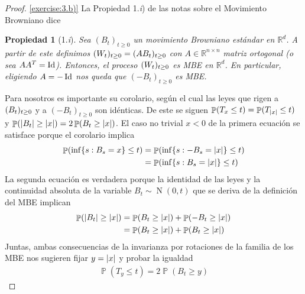 \documentclass{article}
\DeclareMathOperator{\prob}{\mathbb{P}}
\DeclareMathOperator{\normal}{N}
\DeclareMathOperator{\identity}{\textnormal{Id}}
\newcommand{\realnum}{\mathbb{R}}
\newcommand{\transpose}[1]{#1^T}
\newcommand{\brownian}{B}
\newtheorem{property}{Propiedad}
\theoremstyle{definition}
\begin{document}
\begin{proof} \ref{exercise:3.b)}
La Propiedad 1.\textit{i}) de las notas sobre el Movimiento Browniano dice
\begin{property}[1.\textit{i}]
\label{NotasMovimientoBrowniano_property:1.i)}
Sea \((\brownian_t)_{t \geq 0}\) un movimiento Browniano estándar en \(\realnum^d\).
A partir de este definimos \(\wienerProcess = (A \brownian_t)_{t \geq 0}\) con \(A \in \realnum^{n \times n}\) matriz ortogonal (o sea \(A \transpose{A} = \identity\)).
Entonces, el proceso \((W_t)_{t \geq 0}\) es MBE en \(\realnum^d\).
En particular, eligiendo \(A = - \identity\) nos queda que \((- \brownian_t)_{t \geq 0}\) es MBE.
\end{property}
Para nosotros es importante su corolario, según el cual las leyes que rigen a \(\brownianProcess\) y a \((- \brownian_t)_{t \geq 0}\) son idénticas.
De este se siguen \(\prob(T_x \leq t) = \prob(T_{\abs{x}} \leq t)\) y \(\prob(\abs{\brownian_t} \geq \abs{x}) = 2 \prob(\brownian_t \geq \abs{x})\).
El caso no trivial \(x < 0\) de la primera ecuación se satisface porque el corolario implica
\begin{align}
	\prob(\inf\{s : \brownian_s = x\} \leq t)
	&=
	\prob(\inf\{s : - \brownian_s = \abs{x}\} \leq t)
	\\
	&=
	\prob(\inf\{s : \brownian_s = \abs{x}\} \leq t)
\end{align}
La segunda ecuación es verdadera porque la identidad de las leyes y la continuidad absoluta de la variable \(\brownian_t \sim \normal (0, t)\) que se deriva de la definición del MBE implican
\begin{align}
	\prob(\abs{\brownian_t} \geq \abs{x})
	&=
	\prob(\brownian_t \geq \abs{x}) + \prob(- \brownian_t \geq \abs{x})
	\\
	&= 
	\prob(\brownian_t \geq \abs{x}) + \prob(\brownian_t \geq \abs{x})
\end{align}
Juntas, ambas consecuencias de la invarianza por rotaciones de la familia de los MBE nos sugieren fijar \(y = \abs{x}\) y probar la igualdad
\begin{align}
	\prob(T_y \leq t)
	=
	2 \prob(\brownian_t \geq y)
\end{align}


\end{proof}
\end{document}
